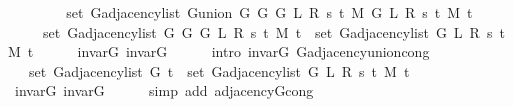\begin{isabellebody}
%
\isadelimproof
%
\endisadelimproof
%
\isatagproof
{}\isamarkupfalse%
\ {\isacharminus}{\kern0pt}\isanewline
\ \ \isamarkupfalse%
\isanewline
\ \ \ \ {\isachardoublequoteopen}set\ {\isacharparenleft}{\kern0pt}G{\isachardot}{\kern0pt}adjacency{\isacharunderscore}{\kern0pt}list\ {\isacharparenleft}{\kern0pt}G{\isachardot}{\kern0pt}union\ {\isacharparenleft}{\kern0pt}G{}\ G\ {\isacharparenleft}{\kern0pt}G{}\ L\ R\ s\ t\ M{\isacharparenright}{\kern0pt}{\isacharparenright}{\kern0pt}\ {\isacharparenleft}{\kern0pt}G{}\ L\ R\ s\ t\ M{\isacharparenright}{\kern0pt}{\isacharparenright}{\kern0pt}\ t{\isacharparenright}{\kern0pt}\ {\isacharequal}{\kern0pt}\isanewline
\ \ \ \ \ set\ {\isacharparenleft}{\kern0pt}G{\isachardot}{\kern0pt}adjacency{\isacharunderscore}{\kern0pt}list\ {\isacharparenleft}{\kern0pt}G{}\ G\ {\isacharparenleft}{\kern0pt}G{}\ L\ R\ s\ t\ M{\isacharparenright}{\kern0pt}{\isacharparenright}{\kern0pt}\ t{\isacharparenright}{\kern0pt}\ {\isasymunion}\ set\ {\isacharparenleft}{\kern0pt}G{\isachardot}{\kern0pt}adjacency{\isacharunderscore}{\kern0pt}list\ {\isacharparenleft}{\kern0pt}G{}\ L\ R\ s\ t\ M{\isacharparenright}{\kern0pt}\ t{\isacharparenright}{\kern0pt}{\isachardoublequoteclose}\isanewline
\ \ \ \ \isamarkupfalse%
\ invar{\isacharunderscore}{\kern0pt}G\ invar{\isacharunderscore}{\kern0pt}G{}\isanewline
\ \ \ \ \isamarkupfalse%
\ {\isacharparenleft}{\kern0pt}intro\ invar{\isacharunderscore}{\kern0pt}G{}\ G{\isachardot}{\kern0pt}adjacency{\isacharunderscore}{\kern0pt}union{\isacharunderscore}{\kern0pt}cong{\isacharparenright}{\kern0pt}\isanewline
\ \ \isamarkupfalse%
\ \isamarkupfalse%
\ {\isachardoublequoteopen}{\isachardot}{\kern0pt}{\isachardot}{\kern0pt}{\isachardot}{\kern0pt}\ {\isacharequal}{\kern0pt}\ set\ {\isacharparenleft}{\kern0pt}G{\isachardot}{\kern0pt}adjacency{\isacharunderscore}{\kern0pt}list\ G\ t{\isacharparenright}{\kern0pt}\ {\isasymunion}\ set\ {\isacharparenleft}{\kern0pt}G{\isachardot}{\kern0pt}adjacency{\isacharunderscore}{\kern0pt}list\ {\isacharparenleft}{\kern0pt}G{}\ L\ R\ s\ t\ M{\isacharparenright}{\kern0pt}\ t{\isacharparenright}{\kern0pt}{\isachardoublequoteclose}\isanewline
\ \ \ \ \isamarkupfalse%
\ invar{\isacharunderscore}{\kern0pt}G\ invar{\isacharunderscore}{\kern0pt}G{}\isanewline
\ \ \ \ \isamarkupfalse%
\ {\isacharparenleft}{\kern0pt}simp\ add{\isacharcolon}{\kern0pt}\ adjacency{\isacharunderscore}{\kern0pt}G{}{\isacharunderscore}{\kern0pt}cong{\isacharparenright}{\kern0pt}\isanewline

\end{isabellebody}
